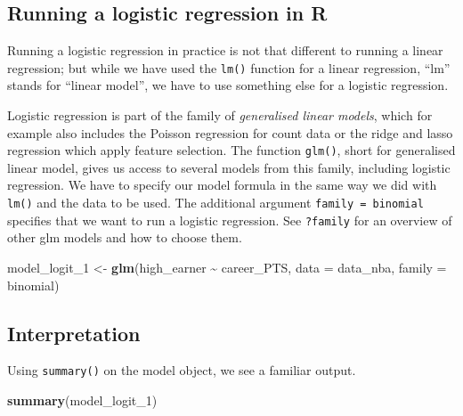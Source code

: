 \documentclass[
]{book}
\newenvironment{Shaded}{\begin{snugshade}}{\end{snugshade}}
\newcommand{\AttributeTok}[1]{\textcolor[rgb]{0.13,0.29,0.53}{#1}}
\newcommand{\FunctionTok}[1]{\textcolor[rgb]{0.13,0.29,0.53}{\textbf{#1}}}
\newcommand{\NormalTok}[1]{#1}
\newcommand{\OtherTok}[1]{\textcolor[rgb]{0.56,0.35,0.01}{#1}}
\newcommand{\SpecialCharTok}[1]{\textcolor[rgb]{0.81,0.36,0.00}{\textbf{#1}}}
\begin{document}
\hypertarget{running-a-logistic-regression-in-r}{%
\subsection{Running a logistic regression in R}\label{running-a-logistic-regression-in-r}}

Running a logistic regression in practice is not that different to
running a linear regression; but while we have used the \texttt{lm()} function
for a linear regression, ``lm'' stands for ``linear model'', we have to use
something else for a logistic regression.

Logistic regression is part of the family of \emph{generalised linear models},
which for example also includes the Poisson regression for count data or
the ridge and lasso regression which apply feature selection. The
function \texttt{glm()}, short for generalised linear model, gives us access
to several models from this family, including logistic regression. We
have to specify our model formula in the same way we did with \texttt{lm()} and
the data to be used. The additional argument \texttt{family\ =\ binomial}
specifies that we want to run a logistic regression. See \texttt{?family} for
an overview of other glm models and how to choose them.

\begin{Shaded}
\begin{Highlighting}[]
\NormalTok{model\_logit\_1 }\OtherTok{\textless{}{-}} \FunctionTok{glm}\NormalTok{(high\_earner }\SpecialCharTok{\textasciitilde{}}\NormalTok{ career\_PTS,}
                     \AttributeTok{data =}\NormalTok{ data\_nba,}
                     \AttributeTok{family =}\NormalTok{ binomial)}
\end{Highlighting}
\end{Shaded}

\hypertarget{interpretation-2}{%
\subsection{Interpretation}\label{interpretation-2}}

Using \texttt{summary()} on the model object, we see a familiar output.

\begin{Shaded}
\begin{Highlighting}[]
\FunctionTok{summary}\NormalTok{(model\_logit\_1)}
\end{Highlighting}
\end{Shaded}
\end{document}
